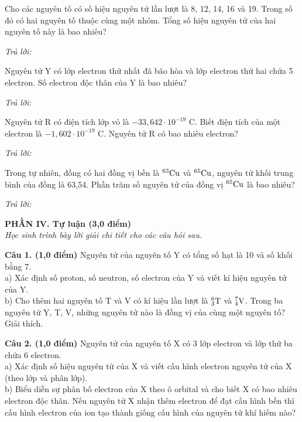 \documentclass[11pt,a4paper]{article}
\begin{document}
\begin{ex}
Cho các nguyên tố có số hiệu nguyên tử lần lượt là 8, 12, 14, 16 và 19. Trong số đó có hai nguyên tố thuộc cùng một nhóm. Tổng số hiệu nguyên tử của hai nguyên tố này là bao nhiêu?

\noindent\textit{Trả lời:} \dotfill
\end{ex}
\begin{ex}
Nguyên tử Y có lớp electron thứ nhất đã bão hòa và lớp electron thứ hai chứa 5 electron. Số electron độc thân của Y là bao nhiêu?

\noindent\textit{Trả lời:} \dotfill
\end{ex}
\begin{ex}
Nguyên tử R có điện tích lớp vỏ là $-33{,}642\cdot 10^{-19}\text{ C}$. Biết điện tích của một electron là $-1{,}602\cdot 10^{-19}\text{ C}$. Nguyên tử R có bao nhiêu electron?

\noindent\textit{Trả lời:} \dotfill
\end{ex}
\begin{ex}
Trong tự nhiên, đồng có hai đồng vị bền là $^{63}\ce{Cu}$ và $^{65}\ce{Cu}$, nguyên tử khối trung bình của đồng là 63,54. Phần trăm số nguyên tử của đồng vị $^{65}\ce{Cu}$ là bao nhiêu?

\noindent\textit{Trả lời:} \dotfill
\end{ex}
\vspace{6pt}
\noindent
{\color{mainGreen}\textbf{\large PHẦN IV. Tự luận (3,0 điểm)}}\\
\textit{\small Học sinh trình bày lời giải chi tiết cho các câu hỏi sau.}
\vspace{2pt}

\noindent
\textbf{Câu 1. (1,0 điểm)} Nguyên tử của nguyên tố Y có tổng số hạt là 10 và số khối bằng 7.\\
a) Xác định số proton, số neutron, số electron của Y và viết kí hiệu nguyên tử của Y.\\
b) Cho thêm hai nguyên tố T và V có kí hiệu lần lượt là $^{6}_{3}\ce{T}$ và $^{7}_{4}\ce{V}$. Trong ba nguyên tử Y, T, V, những nguyên tử nào là đồng vị của cùng một nguyên tố? Giải thích.

\vspace{1pt}
\noindent
{}

\vspace{4pt}
\noindent
\textbf{Câu 2. (1,0 điểm)} Nguyên tử của nguyên tố X có 3 lớp electron và lớp thứ ba chứa 6 electron.\\
a) Xác định số hiệu nguyên tử của X và viết cấu hình electron nguyên tử của X (theo lớp và phân lớp).\\
b) Biểu diễn sự phân bố electron của X theo ô orbital và cho biết X có bao nhiêu electron độc thân. Nếu nguyên tử X nhận thêm electron để đạt cấu hình bền thì cấu hình electron của ion tạo thành giống cấu hình của nguyên tử khí hiếm nào?
\end{document}
